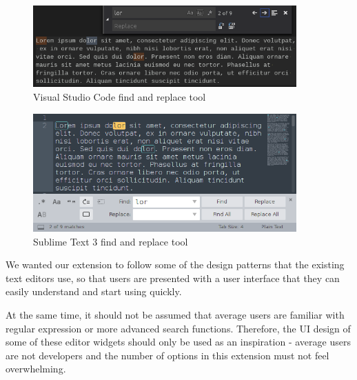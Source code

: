 \documentclass[bsc,frontabs,twoside,singlespacing,parskip,deptreport]{infthesis}
\begin{document}
\begin{figure}[hp]
\centering
\includegraphics[width=0.9\textwidth]{../docs/editor-find-and-replace/vscode-find-and-replace.png}
\caption{Visual Studio Code find and replace tool}
\end{figure}

\begin{figure}[hp]
\centering
\includegraphics[width=0.9\textwidth]{../docs/editor-find-and-replace/sublime-find-and-replace.png}
\caption{Sublime Text 3 find and replace tool}
\end{figure}

We wanted our extension to follow some of the design patterns that the existing text editors use, so that users are presented with a user interface that they can easily understand and start using quickly.

At the same time, it should not be assumed that average users are familiar with regular expression or more advanced search functions. Therefore, the UI design of some of these editor widgets should only be used as an inspiration - average users are not developers and the number of options in this extension must not feel overwhelming.
\end{document}
